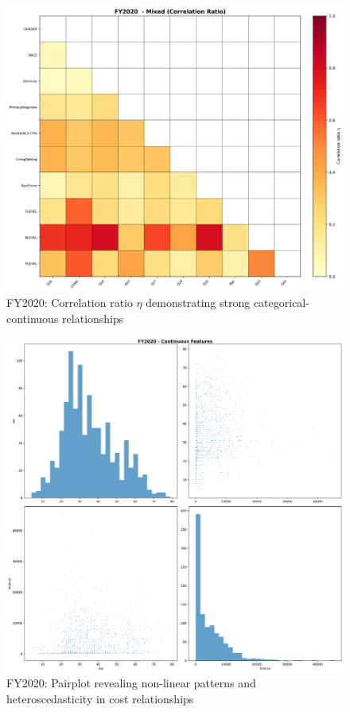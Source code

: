 \newpage

\vspace*{\fill}
\begin{figure}[htbp]
\centering
\includegraphics[width=\textwidth]{fy2020_mixed_correlation_ratio.png}
\caption{FY2020: Correlation ratio $\eta$ demonstrating strong categorical-continuous relationships}
\end{figure}
\vspace*{\fill}

\newpage

\vspace*{\fill}
\begin{figure}[htbp]
\centering
\includegraphics[width=\textwidth]{fy2020_pairplot_top_features.png}
\caption{FY2020: Pairplot revealing non-linear patterns and heteroscedasticity in cost relationships}
\end{figure}
\vspace*{\fill}

